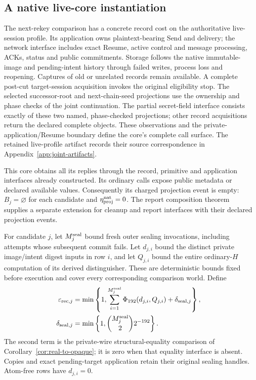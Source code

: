 \subsection{A native live-core instantiation}
\label{sec:live-core-instantiation}

The next-rekey comparison has a concrete record cost on the authoritative
live-session profile. Its application owns plaintext-bearing Send and
delivery; the network interface includes exact Resume, active control and
message processing, ACKs, status and public commitments. Storage follows
the native immutable-image and pending-intent history through failed writes,
process loss and reopening. Captures of old or unrelated records remain
available. A complete post-cut target-session acquisition invokes the
original eligibility stop. The selected successor-root and next-chain-seed
projections use the ownership and phase checks of the joint continuation.
The partial secret-field interface consists exactly of these two named,
phase-checked projections; other record acquisitions return the declared
complete objects. These observations and the private-application/Resume
boundary define the core's complete call surface. The retained live-profile
artifact records their source correspondence in
Appendix~\ref{app:joint-artifacts}.

This core obtains all its replies through the record, primitive and
application interfaces already constructed. Its ordinary calls expose
public metadata or declared available values. Consequently its charged
projection event is empty: $B_j=\varnothing$ for each candidate and
$\eta_{\rm proj}^{\rm nat}=0$. The report composition theorem supplies a
separate extension for cleanup and report interfaces with their declared
projection events.

For candidate $j$, let $M_j^{\rm seal}$ bound fresh outer sealing
invocations, including attempts whose subsequent commit fails. Let
$d_{j,i}$ bound the distinct private image/intent digest inputs in row $i$,
and let $Q_{j,i}$ bound the entire ordinary-$H$ computation of its derived
distinguisher. These are deterministic bounds fixed before execution and
cover every corresponding comparison world. Define
\begin{equation}
\begin{split}
 \varepsilon_{{\rm rec},j}
 &=\min\left\{1,
     \sum_{i=1}^{M_j^{\rm seal}}\Phi_{192}(d_{j,i},Q_{j,i})
       +\delta_{{\rm seal},j}\right\},\\
 \delta_{{\rm seal},j}
 &=\min\left\{1,\binom{M_j^{\rm seal}}{2}2^{-192}\right\}.
\end{split}
\label{eq:live-core-record-cost}
\end{equation}
The second term is the private-wire structural-equality comparison of
Corollary~\ref{cor:real-to-opaque}; it is zero when that equality interface
is absent. Copies and exact pending-target application retain their
original sealing handles. Atom-free rows have $d_{j,i}=0$.

